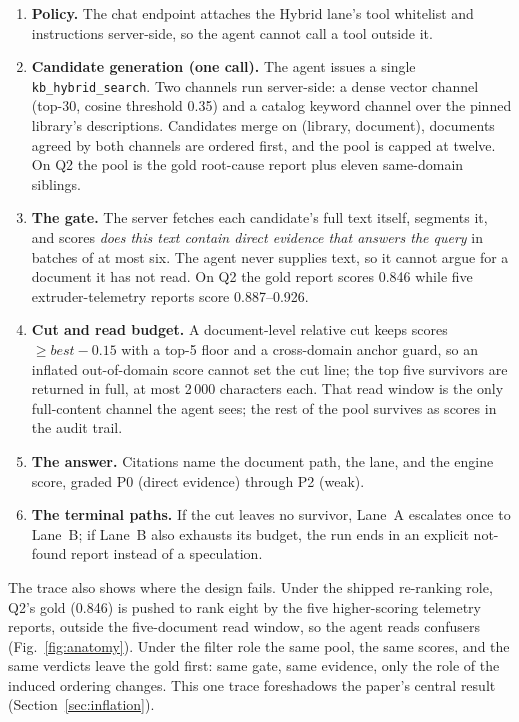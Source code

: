 \begin{enumerate}
\item \textbf{Policy.} The chat endpoint attaches the Hybrid lane's tool
whitelist and instructions server-side, so the agent cannot call a tool outside
it.
\item \textbf{Candidate generation (one call).} The agent issues a single
\texttt{kb\_hybrid\_search}. Two channels run server-side: a dense vector channel
(top-30, cosine threshold 0.35) and a catalog keyword channel over the pinned
library's descriptions. Candidates merge on (library, document), documents
agreed by both channels are ordered first, and the pool is capped at twelve. On
Q2 the pool is the gold root-cause report plus eleven same-domain siblings.
\item \textbf{The gate.} The server fetches each candidate's full text itself,
segments it, and scores \emph{does this text contain direct evidence that answers
the query} in batches of at most six. The agent never supplies text, so it cannot
argue for a document it has not read. On Q2 the gold report scores 0.846 while
five extruder-telemetry reports score 0.887--0.926.
\item \textbf{Cut and read budget.} A document-level relative cut keeps scores
$\geq \mathit{best}-0.15$ with a top-5 floor and a cross-domain anchor guard, so
an inflated out-of-domain score cannot set the cut line; the top five survivors
are returned in full, at most 2\,000 characters each. That read window is the
only full-content channel the agent sees; the rest of the pool survives as
scores in the audit trail.
\item \textbf{The answer.} Citations name the document path, the lane, and the
engine score, graded P0 (direct evidence) through P2 (weak).
\item \textbf{The terminal paths.} If the cut leaves no survivor, Lane~A
escalates once to Lane~B; if Lane~B also exhausts its budget, the run ends in an
explicit not-found report instead of a speculation.
\end{enumerate}

The trace also shows where the design fails. Under the shipped re-ranking role,
Q2's gold (0.846) is pushed to rank eight by the five higher-scoring telemetry
reports, outside the five-document read window, so the agent reads confusers
(Fig.~\ref{fig:anatomy}). Under the filter role the same pool, the same scores,
and the same verdicts leave the gold first: same gate, same evidence, only the
role of the induced ordering changes. This one trace foreshadows the paper's
central result (Section~\ref{sec:inflation}).

